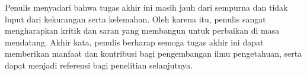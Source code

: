 \begin{justifying}
	Penulis menyadari bahwa tugas akhir ini masih jauh dari sempurna dan tidak luput dari kekurangan serta kelemahan. Oleh karena itu, penulis sangat mengharapkan kritik dan saran yang membangun untuk perbaikan di masa mendatang. Akhir kata, penulis berharap semoga tugas akhir ini dapat memberikan manfaat dan kontribusi bagi pengembangan ilmu pengetahuan, serta dapat menjadi referensi bagi penelitian selanjutnya.
	\vfill
	
\end{justifying}
\clearpage

